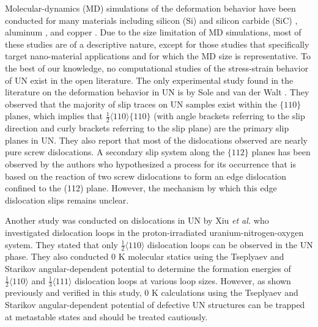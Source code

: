 \documentclass[applsci,article,submit,pdftex,moreauthors]{Definitions/mdpi}
\newcommand{\?}{\stackrel{?}{=}}
\begin{document}
Molecular-dynamics (MD) simulations of the deformation behavior have been conducted for many materials including silicon (Si) and silicon carbide (SiC) \cite{Ivashchenko2007}, aluminum \cite{Li2020}, and copper \cite{Hansson2022}. Due to the size limitation of MD simulations, most of these studies are of a descriptive nature, except for those studies that specifically target nano-material applications and for which the MD size is representative. To the best of our knowledge, no computational studies of the stress-strain behavior of UN exist in the open literature. The only experimental study found in the literature on the deformation behavior in UN is by Sole and van der Walt \cite{Sole1968}. They observed that the majority of slip traces on UN samples exist within the $\{110\}$ planes, which implies that $\frac{1}{2} \langle 110 \rangle \{110\}$ (with angle brackets referring to the slip direction and curly brackets referring to the slip plane) are the primary slip planes in UN. They also report that most of the dislocations observed are nearly pure screw dislocations. A secondary slip system along the $\{112\}$ planes has been observed by the authors who hypothesized a process for its occurrence that is based on the reaction of two screw dislocations to form an edge dislocation confined to the (112) plane. However, the mechanism by which this edge dislocation slips remains unclear.

Another study was conducted on dislocations in UN by Xiu \textit{et al.} \cite{Xiu2021} who investigated dislocation loops in the proton-irradiated uranium-nitrogen-oxygen system. They stated that only $\frac{1}{2} \langle 110 \rangle$ dislocation loops can be observed in the UN phase. They also conducted 0 K molecular statics using the Tseplyaev and Starikov angular-dependent potential \cite{Tseplyaev2016} to determine the formation energies of $\frac{1}{2} \langle 110 \rangle$ and $\frac{1}{3} \langle 111 \rangle$ dislocation loops at various loop sizes. However, as shown previously \cite{AbdulHameed2024} and verified in this study, 0 K calculations using the Tseplyaev and Starikov angular-dependent potential \cite{Tseplyaev2016} of defective UN structures can be trapped at metastable states and should be treated cautiously. 
\end{document}

